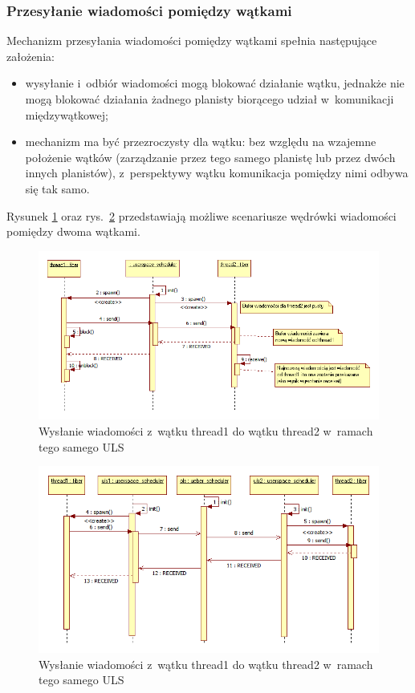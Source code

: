 \documentclass[11pt,makeidx]{mwart}
\begin{document}
\subsubsection{Przesyłanie wiadomości pomiędzy wątkami}
\indent
	Mechanizm przesyłania wiadomości pomiędzy wątkami spełnia następujące założenia:
	\begin{itemize}
		\item wysyłanie i~odbiór wiadomości mogą blokować działanie wątku, jednakże nie mogą blokować działania żadnego planisty biorącego udział
			w~komunikacji międzywątkowej;
		\item mechanizm ma być przezroczysty dla wątku: bez względu na wzajemne położenie wątków (zarządzanie przez tego samego planistę lub
			przez dwóch innych planistów), z~perspektywy wątku komunikacja pomiędzy nimi odbywa się tak samo.
	\end{itemize}
	Rysunek \ref{fig:interthreadmessaging1} oraz rys.~\ref{fig:interthreadmessaging2} przedstawiają możliwe scenariusze wędrówki wiadomości 
	pomiędzy dwoma wątkami.
	\begin{figure}[h!]
		\label{fig:interthreadmessaging1}
		\centering
		\hspace*{-1cm}\includegraphics[scale=.6,angle=90]{InterThread1.png}
		\caption{Wysłanie wiadomości z~wątku thread1 do wątku thread2 w~ramach tego samego ULS}
	\end{figure}
	\begin{figure}[h!]
		\label{fig:interthreadmessaging2}
		\centering
		\hspace*{-1cm}\includegraphics[scale=.6,angle=90]{InterThread2.png}
		\caption{Wysłanie wiadomości z~wątku thread1 do wątku thread2 w~ramach tego samego ULS}
	\end{figure}
\end{document}

